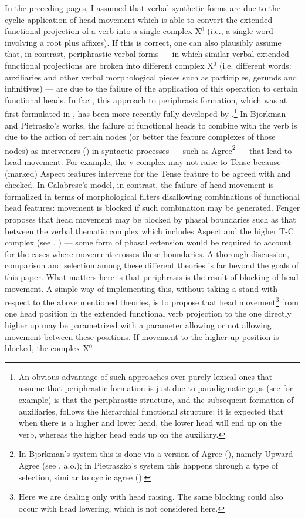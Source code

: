 \documentclass[output=paper]{langscibook}
\begin{document}
In the preceding pages, I assumed that verbal synthetic forms are due to the cyclic application of head movement which is able to convert the extended functional projection of a verb into a single complex X$^0$ (i.e., a single word involving a root plus affixes). If this is correct, one can also plausibly assume that, in contrast, periphrastic verbal forms — in which similar verbal extended functional projections are broken into different complex X$^0$ (i.e. different words: auxiliaries and other verbal morphological pieces such as participles, gerunds and infinitives) — are due to the failure of the application of this operation to certain functional heads. In fact, this approach to periphrasis formation, which was at first formulated in \cite{embick2000a}, has been more recently fully developed by \cite{bjorkman2011a, pietraszko2016a, fenger2020a, calabrese2019a}.\footnote{An obvious advantage of such approaches over purely lexical ones that assume that periphrastic formation is just due to paradigmatic gaps (see \cite{kiparsky2004a} for example) is that the periphrastic structure, and the subsequent formation of auxiliaries, follows the hierarchial functional structure: it is expected that when there is a higher and lower head, the lower head will end up on the verb, whereas the higher head ends up on the auxiliary.}  In Bjorkman and Pietrasko’s works, the failure of functional heads to combine with the verb is due to the action of certain nodes (or better the feature complexes of those nodes) as interveners (\cite{rizzi1990a}) in syntactic processes — such as Agree\footnote{In Bjorkman’s system this is done via a version of Agree (\cite{chomsky2000a, chomsky2001}), namely Upward Agree (see \cite{merchant2011a}, a.o.); in Pietraszko’s system this happens through a type of selection, similar to cyclic agree (\cite{bejar2009a}).}  — that lead to head movement. For example, the v-complex may not raise to Tense because (marked) Aspect features intervene for the Tense feature to be agreed with and checked. In Calabrese’s model, in contrast, the failure of head movement is formalized in terms of morphological filters disallowing combinations of functional head features: movement is blocked if such combination may be generated. Fenger proposes that head movement may be blocked by phasal boundaries such as that between the verbal thematic complex which includes Aspect and the higher T-C complex (see \cite{bo2014a}, \cite{wurmbrand2017verb}) — some form of phasal extension would be required to account for the cases where movement crosses these boundaries.  A thorough discussion, comparison and selection among these different theories is far beyond the goals of this paper.  What matters here is that periphrasis is the result of blocking of head movement. A simple way of implementing this, without taking a stand with respect to the above mentioned theories, is to propose that head movement\footnote{Here we are dealing only with head raising. The same blocking could also occur with head lowering, which is not considered here.}  from one head position in the extended functional verb projection to the one directly higher up may be parametrized with a parameter allowing or not allowing movement between these positions. If movement to the higher up position is blocked, the complex X$^0$ 
\end{document}
